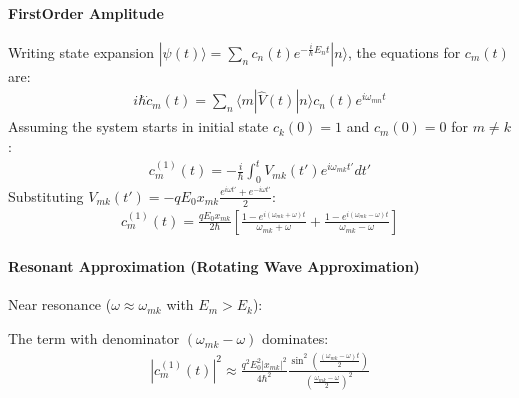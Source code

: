 \documentclass[letterpaper,10pt,english]{jupyterBook}
\begin{document}
\paragraph{First\sphinxhyphen{}Order Amplitude}
\label{\detokenize{ch/quantum-mechanics/history/heisenberg-reinterpretation:first-order-amplitude}}
\sphinxAtStartPar
Writing state expansion \(|\psi(t)\rangle = \sum_n c_n(t) e^{-\frac{i}{\hbar}E_n t} |n\rangle\), the equations for \(c_m(t)\) are:
\begin{equation*}
\begin{split}i\hbar \dot{c}_m(t) = \sum_n \langle m | \hat{V}(t) | n \rangle c_n(t) e^{i \omega_{mn} t}\end{split}
\end{equation*}
\sphinxAtStartPar
Assuming the system starts in initial state \(c_k(0) = 1\) and \(c_m(0) = 0\) for \(m \neq k\):
\begin{equation*}
\begin{split}c_m^{(1)}(t) = -\frac{i}{\hbar} \int_0^t V_{mk}(t') e^{i \omega_{mk} t'} dt'\end{split}
\end{equation*}
\sphinxAtStartPar
Substituting \(V_{mk}(t') = -q E_0 x_{mk} \frac{e^{i\omega t'} + e^{-i\omega t'}}{2}\):
\begin{equation*}
\begin{split}c_m^{(1)}(t) = \frac{q E_0 x_{mk}}{2\hbar} \left[ \frac{1 - e^{i(\omega_{mk} + \omega)t}}{\omega_{mk} + \omega} + \frac{1 - e^{i(\omega_{mk} - \omega)t}}{\omega_{mk} - \omega} \right]\end{split}
\end{equation*}

\paragraph{Resonant Approximation (Rotating Wave Approximation)}
\label{\detokenize{ch/quantum-mechanics/history/heisenberg-reinterpretation:resonant-approximation-rotating-wave-approximation}}
\sphinxAtStartPar
Near resonance (\(\omega \approx \omega_{mk}\) with \(E_m > E_k\)):

\sphinxAtStartPar
The term with denominator \((\omega_{mk} - \omega)\) dominates:
\begin{equation*}
\begin{split}|c_m^{(1)}(t)|^2 \approx \frac{q^2 E_0^2 |x_{mk}|^2}{4\hbar^2} \frac{\sin^2\left(\frac{(\omega_{mk} - \omega)t}{2}\right)}{\left(\frac{\omega_{mk} - \omega}{2}\right)^2}\end{split}
\end{equation*}
\end{document}
